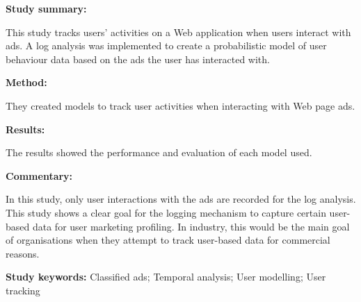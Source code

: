 \begin{tcolorbox}[colback=gray!5!white, colframe=pastelgreen!40!black, title=Tracking User Activities and Marketplace Dynamics in Classified Ads\cite{Waqar2017}]
	\begin{minipage}[t]{0.25\textwidth}
		\textbf{Study summary:}
	\end{minipage}
	\hfill
	\begin{minipage}[t]{0.65\textwidth}
		This study tracks users' activities on a Web application when users interact with ads. A log
		analysis was implemented to create a probabilistic model of user behaviour data based on the
ads the user has interacted with.
	\end{minipage}

	\vspace{0.75em} 

	\begin{minipage}[t]{0.25\textwidth}
		\textbf{Method:}
	\end{minipage}
	\hfill
	\begin{minipage}[t]{0.65\textwidth}
		They created models to track user activities when interacting with Web page ads.
	\end{minipage}

	\vspace{0.75em} 

	\begin{minipage}[t]{0.25\textwidth}
		\textbf{Results:}
	\end{minipage}
	\hfill
	\begin{minipage}[t]{0.65\textwidth}
		The results showed the performance and evaluation of each model used.
	\end{minipage}

	\vspace{0.75em} 

	\begin{minipage}[t]{0.25\textwidth}
		\textbf{Commentary:}
	\end{minipage}
	\hfill
	\begin{minipage}[t]{0.65\textwidth}
		In this study, only user interactions with the ads are recorded for the log analysis. This
study shows a clear goal for the logging mechanism to capture certain user-based data for
user marketing profiling. In industry, this would be the main goal of organisations when
they attempt to track user-based data for commercial reasons.
	\end{minipage}
	\tcblower
	\textbf{Study keywords:} Classified ads; Temporal analysis; User modelling; User tracking
\end{tcolorbox}

